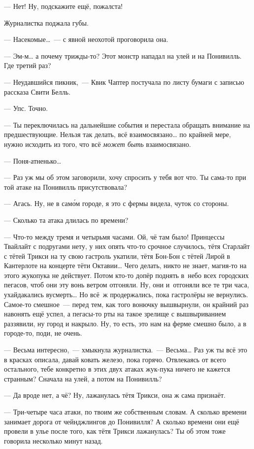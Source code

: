 \documentclass[fontsize=11pt,a5paper,titlepage=firstcover]{scrbook}
\begin{document}
--- Нет! Ну, подскажите ещё, пожалста!

Журналистка поджала губы.

--- Насекомые{\ldots}~--- с явной неохотой проговорила она.

--- Эм-м{\ldots} а почему трижды-то? Этот монстр нападал на улей и на Понивилль. Где третий раз?

--- Неудавшийся пикник,~--- Квик Чаптер постучала по листу бумаги с записью рассказа Свити Белль.

--- Упс. Точно.

--- Ты переключилась на дальнейшие события и перестала обращать внимание на предшествующие. Нельзя так делать, всё взаимосвязано{\ldots} по крайней мере, нужно исходить из того, что всё \emph{может быть} взаимосвязано.

--- Поня-атненько{\ldots}

--- Раз уж мы об этом заговорили, хочу спросить у тебя вот что. Ты сама-то при той атаке на Понивилль присутствовала?

--- Агась. Ну, не в само́м городе, я это с фермы видела, чуток со стороны.

--- Сколько та атака длилась по времени?

--- Что-то между тремя и четырьмя часами. Ой, чё там было! Принцессы Твайлайт с подругами нету, у них опять что-то срочное случилось, тётя Старлайт с тётей Трикси на ту свою гастроль укатили, тётя Бон-Бон с тётей Лирой в Кантерлоте на концерте тёти Октавии{\ldots} Чего делать, никто не знает, магия-то на этого жукопука не действует. Потом кто-то допёр поднять в~небо всех городских пегасов, чтоб они эту вонь ветром отгоняли. Ну, они и~отгоняли все те три часа, ухайдакались вусмерть{\ldots} Но всё~ж продержались, пока гастролёры не вернулись. Самое-то смешное~--- перед тем, как того вонючку вышвырнули, он крайний раз навонять ещё успел, а пегасы-то рты на такое зрелище с вышвыриванием раззявили, ну город и накрыло. Ну, то есть, это нам на ферме смешно было, а в городе-то, поди, не очень.

--- Весьма интересно,~--- хмыкнула журналистка.~--- Весьма{\ldots} Раз уж ты всё это в красках описала, давай ковать железо, пока горячо. Отвлекаясь от всего остального, тебе конкретно в этих двух атаках жук-пука ничего не кажется странным? Сначала на улей, а потом на Понивилль?

--- Да вроде нет, а чё? Ну, лажанулась тётя Трикси, она ж сама признаёт.

--- Три-четыре часа атаки, по твоим же собственным словам. А сколько времени занимает дорога от чейнджлингов до Понивилля? А сколько времени они ещё провели в улье после того, как тётя Трикси лажанулась? Ты об этом тоже говорила несколько минут назад.
\end{document}
